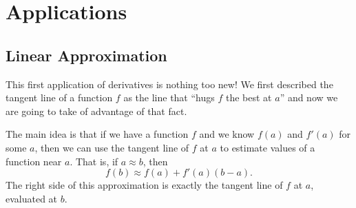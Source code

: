 
\section{Applications}


\subsection{Linear Approximation}

This first application of derivatives is nothing too new! We first described the tangent line of a function $f$ as the line that ``hugs $f$ the best at $a$'' and now we are going to take of advantage of that fact.

The main idea is that if we have a function $f$ and we know $f(a)$ and $f'(a)$ for some $a$, then we can use the tangent line of $f$ at $a$ to estimate values of a function near $a$. That is, if $a\approx b$, then
$$f(b)\approx f(a)+f'(a)(b-a).$$
The right side of this approximation is exactly the tangent line of $f$ at $a$, evaluated at $b$.

